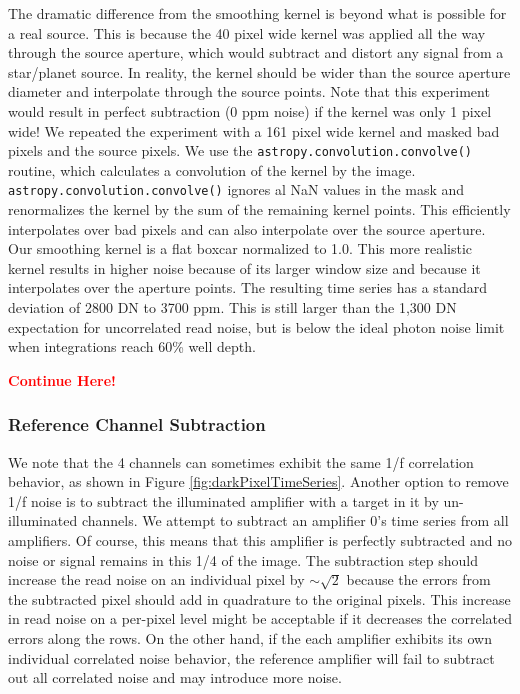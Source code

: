 \documentclass{aastex62}
\begin{document}
The dramatic difference from the smoothing kernel is beyond what is possible for a real source.
This is because the 40 pixel wide kernel was applied all the way through the source aperture, which would subtract and distort any signal from a star/planet source.
In reality, the kernel should be wider than the source aperture diameter and interpolate through the source points.
Note that this experiment would result in perfect subtraction (0 ppm noise) if the kernel was only 1 pixel wide!
We repeated the experiment with a 161 pixel wide kernel and masked bad pixels and the source pixels.
We use the \texttt{astropy.convolution.convolve()} routine, which calculates a convolution of the kernel by the image.
\texttt{astropy.convolution.convolve()} ignores al NaN values in the mask and renormalizes the kernel by the sum of the remaining kernel points.
This efficiently interpolates over bad pixels and can also interpolate over the source aperture.
Our smoothing kernel is a flat boxcar normalized to 1.0.
This more realistic kernel results in higher noise because of its larger window size and because it interpolates over the aperture points.
The resulting time series has a standard deviation of 2800 DN to 3700 ppm.
This is still larger than the 1,300 DN expectation for uncorrelated read noise, but is below the ideal photon noise limit when integrations reach 60\% well depth.

\textcolor{red}{\bf Continue Here!}

\subsubsection{Reference Channel Subtraction}
We note that the 4 channels can sometimes exhibit the same 1/f correlation behavior, as shown in Figure \ref{fig:darkPixelTimeSeries}.
Another option to remove 1/f noise is to subtract the illuminated amplifier with a target in it by un-illuminated channels.
We attempt to subtract an amplifier 0's time series from all amplifiers.
Of course, this means that this amplifier is perfectly subtracted and no noise or signal remains in this 1/4 of the image.
The subtraction step should increase the read noise on an individual pixel by $\sim \sqrt{2}$ because the errors from the subtracted pixel should add in quadrature to the original pixels.
This increase in read noise on a per-pixel level might be acceptable if it decreases the correlated errors along the rows.
On the other hand, if the each amplifier exhibits its own individual correlated noise behavior, the reference amplifier will fail to subtract out all correlated noise and may introduce more noise.
\end{document}
